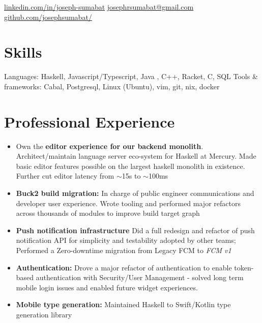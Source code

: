 \documentclass{simple_resume}
\begin{document}
{\href{https://www.linkedin.com/in/joseph-sumabat}{linkedin.com/in/joseph-sumabat}}
{\href{to:josephrsumabat@gmail.com}{josephrsumabat@gmail.com}}
{\href{https://github.com/josephsumabat/}{github.com/josephsumabat/}}

\section{Skills}
\resskillheading
    {Languages:}
    {Haskell, Javascript/Typescript, Java , C++, Racket, C, SQL}
    \resskillheading
    {Tools \& frameworks:}
    { Cabal, Postgresql, Linux (Ubuntu), vim, git, nix, docker }

\section{Professional Experience}
\begin{itemize}
  \item Own the \textbf{editor experience for our backend monolith}. Architect/maintain language server eco-system for Haskell at Mercury. Made basic editor features possible on the largest haskell monolith in existence. Further cut editor latency from $\sim$15s to $\sim$100ms
  \item \textbf{Buck2 build migration:} In charge of public engineer communications and developer user experience. Wrote tooling and performed major refactors across thousands of modules to improve build target graph
\end{itemize}

\begin{itemize}
  \item \textbf{Push notification infrastructure} Did a full redesign and refactor of push notification API for simplicity and testability adopted by other teams; Performed a Zero-downtime migration from Legacy FCM to \emph{FCM v1}
  \item \textbf{Authentication:} Drove a major refactor of authentication to enable token-based authentication with Security/User Management - solved long term mobile login issues and enabled future widget experiences.
  \item \textbf{Mobile type generation:} Maintained Haskell to Swift/Kotlin type generation library 
\end{itemize}
\end{document}
